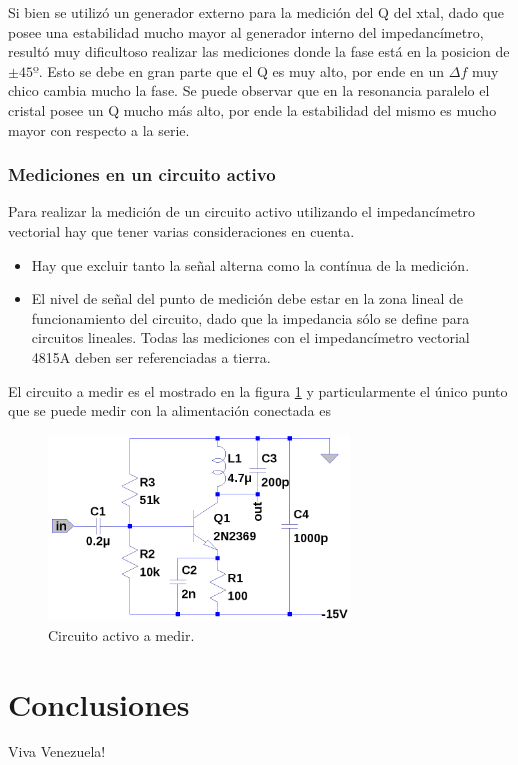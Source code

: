 \documentclass[a4paper,10pt]{article}
\begin{document}
		\indent Si bien se utilizó un generador externo para la medición del Q 
		del xtal, dado que posee una estabilidad mucho mayor al generador 
		interno del impedancímetro, resultó muy dificultoso realizar las 
		mediciones donde la fase está en la posicion de $\pm45º$. Esto se debe 
		en gran parte que el Q es muy alto, por ende en un $\Delta f$ muy chico 
		cambia mucho la fase. Se puede observar que en la resonancia paralelo el
		cristal posee un Q mucho más alto, por ende la estabilidad del mismo es 
		mucho mayor con respecto a la serie.

		\subsubsection{Mediciones en un circuito activo}
		
		\indent Para realizar la medición de un circuito activo utilizando el 
		impedancímetro vectorial hay que tener varias consideraciones en cuenta.
		
		\begin{itemize}
			\item Hay que excluir tanto la señal alterna como la contínua de la 
			medición.
			\item El nivel de señal del punto de medición debe estar en la zona 
			lineal de funcionamiento del circuito, dado que la impedancia sólo 
			se define para circuitos lineales.
			\indent Todas las mediciones con el impedancímetro vectorial 4815A 
			deben ser referenciadas a tierra.
		\end{itemize}
		
		\indent El circuito a medir es el mostrado en la figura \ref{img006} y 
		particularmente el único punto que se puede medir con la alimentación 
		conectada es 

		\begin{figure}[!htb]
			\centering
			\includegraphics[width=8cm]{Imagenes/ActiveCircuit.png}
			\caption{Circuito activo a medir.}
			\label{img006} 
		\end{figure}
	
\section{Conclusiones}
	\indent Viva Venezuela!\\
\end{document}
